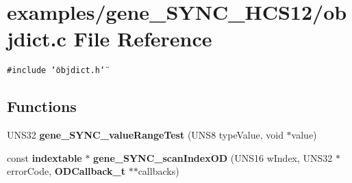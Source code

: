 \section{examples/gene\_\-SYNC\_\-HCS12/objdict.c File Reference}
\label{objdict_8c}
{\tt \#include \char`\"{}objdict.h\char`\"{}}\par
\subsection*{Functions}
\begin{CompactItemize}
\item 
UNS32 {\bf gene\_\-SYNC\_\-value\-Range\-Test} (UNS8 type\-Value, void $\ast$value)
\item 
const {\bf indextable} $\ast$ {\bf gene\_\-SYNC\_\-scan\-Index\-OD} (UNS16 w\-Index, UNS32 $\ast$error\-Code, {\bf ODCallback\_\-t} $\ast$$\ast$callbacks)
\end{CompactItemize}
